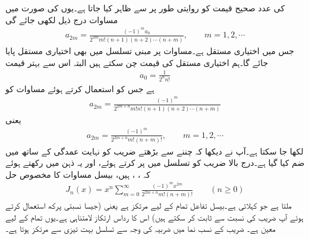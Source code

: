  کی عدد صحیح قیمت کو روایتی طور پر  سے ظاہر کیا جاتا ہے۔یوں  کی صورت میں مساوات   درج ذیل لکھی جائے گی
\begin{align}\label{مساوات_بیسل_چ}
a_{2m}=\frac{(-1)^m a_0}{2^{2m}m!(n+1)(n+2)\cdots (n+m)},\quad \quad m=1,2,\cdots
\end{align}
جس میں  اختیاری مستقل ہے۔مساوات  پر مبنی تسلسل میں بھی اختیاری مستقل  پایا جائے گا۔ہم اختیاری مستقل کی قیمت  چن سکتے ہیں البتہ اس سے بہتر قیمت 
\begin{align}\label{مساوات_بیسل_عددی_سر_الف}
a_0=\frac{1}{2^nn!}
\end{align}
ہے جس کو استعمال کرتے ہوئے مساوات  کو
\begin{align*}
a_{2m}=\frac{(-1)^m}{2^{2m+n}m!n!(n+1)(n+2)\cdots (n+m)}
\end{align*}
یعنی
\begin{align}\label{مساوات_بیسل_ح}
a_{2m}=\frac{(-1)^m}{2^{2m+n}m!(n+m)!},\quad \quad m=1,2,\cdots
\end{align}
لکھا جا سکتا ہے۔آپ نے دیکھا کہ  چننے سے  بڑھتے  ضریب  کو نہایت عمدگی کے ساتھ   میں ضم کیا گیا ہے۔درج بالا  ضریب  کو تسلسل میں پر کرتے ہوئے، اور یہ ذہن میں رکھتے ہوئے کہ ، ،  ہیں، بیسل مساوات  کا مخصوص حل 
\begin{align}\label{مساوات_بیسل_خ}
J_n(x)=x^n\sum_{m=0}^{\infty} \frac{(-1)^m x^{2m}}{2^{2m+n} m!(n+m)!} \quad \quad (n \ge 0)
\end{align}
ملتا ہے جو     کہلاتی ہے۔بیسل تفاعل  تمام  کے لیے  مرتکز ہے یعنی (جیسا  نسبتی پرکھ استعمال کرتے ہوئے آپ  ضریب  کی نسبت   سے ثابت کر سکتے ہیں) اس کا رداس ارتکاز لامتناہی   ہے۔یوں  تمام  کے لیے معین ہے۔ ضریب  کے نسب نما میں ضربیہ  کی  وجہ سے  تسلسل بہت تیزی سے مرتکز ہوتا ہے۔


